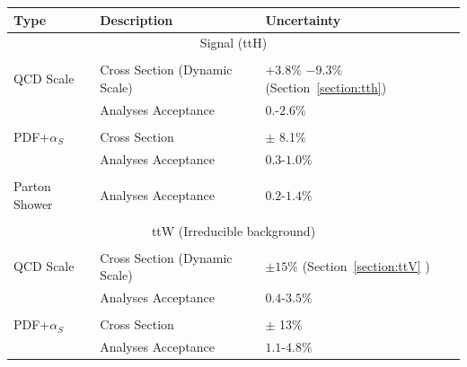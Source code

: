 \begin{table}[htbp]
  \begin{center}
    {\small     
    \begin{tabular}{|lll|}
      \hline
      Type       & Description  &  Uncertainty  \\
     \hline
      \multicolumn{3}{|c|}{Signal (ttH)}\\
     \hline
         &  &                \\
      QCD Scale                    & Cross Section (Dynamic Scale) &    $+3.8\%$  $-9.3\%$   (Section~\ref{section:tth})      \\
                                            & Analyses Acceptance          &    $0.$-$2.6\%$       \\
         & &                \\
      PDF+$\alpha_S$     &   Cross Section  &         $\pm$ 8.1$\%$      \\
                                      &   Analyses Acceptance        &     $0.3$-$1.0\%$        \\

         & &                \\
      Parton Shower     &   Analyses Acceptance  &        $0.2$-$1.4\%$       \\
         & &                \\
     \hline
      \multicolumn{3}{|c|}{ttW (Irreducible background)}\\
     \hline
         & &                \\
      QCD Scale                    & Cross Section (Dynamic Scale)  &    $\pm15\%$  (Section~\ref{section:ttV} )       \\
                                            & Analyses Acceptance   &    $0.4$-$3.5\%$        \\
         & &                \\
      PDF+$\alpha_S$     &   Cross Section  &         $\pm$ 13$\%$      \\
                                      &   Analyses Acceptance  &        $1.1$-$4.8\%$      \\
      

\end{tabular}}
\end{center}
\end{table}
